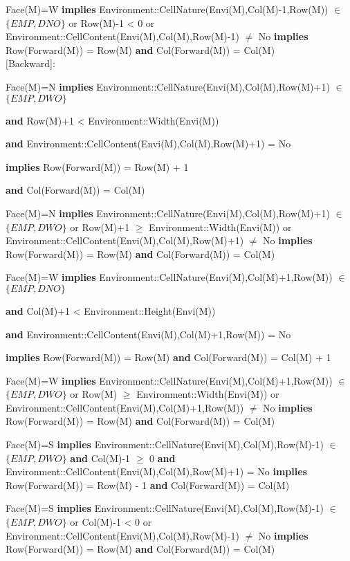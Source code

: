 \documentclass[11pt]{article}
\begin{document}
Face(M)=W \textbf{implies}
Environment::CellNature(Envi(M),Col(M)-1,Row(M)) $\in$
$\{EMP, DNO\}$
or Row(M)-1 < 0
or Environment::CellContent(Envi(M),Col(M),Row(M)-1) $\neq$ No
\textbf{implies} Row(Forward(M)) = Row(M)
\textbf{and} Col(Forward(M)) = Col(M)\\










[Backward]:

Face(M)=N \textbf{implies} Environment::CellNature(Envi(M),Col(M),Row(M)+1) $\in$ $\{EMP, DWO\}$

\textbf{and} Row(M)+1 < Environment::Width(Envi(M))

\textbf{and} Environment::CellContent(Envi(M),Col(M),Row(M)+1) = No

\textbf{implies} Row(Forward(M)) = Row(M) + 1

\textbf{and} Col(Forward(M)) = Col(M) 

Face(M)=N \textbf{implies}
Environment::CellNature(Envi(M),Col(M),Row(M)+1) $\in$  $\{EMP, DWO\}$
or Row(M)+1 $\geq$ Environment::Width(Envi(M)) or Environment::CellContent(Envi(M),Col(M),Row(M)+1) $\neq$ No \textbf{implies} Row(Forward(M)) = Row(M) \textbf{and} Col(Forward(M)) = Col(M)

Face(M)=W \textbf{implies}
Environment::CellNature(Envi(M),Col(M)+1,Row(M)) $\in$ $\{EMP, DNO\}$

\textbf{and} Col(M)+1 < Environment::Height(Envi(M))

\textbf{and} Environment::CellContent(Envi(M),Col(M)+1,Row(M)) = No

\textbf{implies} Row(Forward(M)) = Row(M) \textbf{and} Col(Forward(M)) = Col(M) + 1

Face(M)=W \textbf{implies}
Environment::CellNature(Envi(M),Col(M)+1,Row(M)) $\in$ $\{EMP, DWO\}$
or Row(M) $\geq$ Environment::Width(Envi(M))
or Environment::CellContent(Envi(M),Col(M)+1,Row(M)) $\neq$ No
\textbf{implies} Row(Forward(M)) = Row(M)
\textbf{and} Col(Forward(M)) = Col(M)

Face(M)=S \textbf{implies} Environment::CellNature(Envi(M),Col(M),Row(M)-1) $\in$ $\{EMP, DWO\}$
\textbf{and} Col(M)-1 $\geq$ 0
\textbf{and} Environment::CellContent(Envi(M),Col(M),Row(M)+1) = No
\textbf{implies} Row(Forward(M)) = Row(M) - 1
\textbf{and} Col(Forward(M)) = Col(M)


Face(M)=S \textbf{implies}
Environment::CellNature(Envi(M),Col(M),Row(M)-1) $\in$
$\{EMP, DWO\}$ or Col(M)-1 < 0 or Environment::CellContent(Envi(M),Col(M),Row(M)-1) $\neq$ No
\textbf{implies} Row(Forward(M)) = Row(M)
\textbf{and} Col(Forward(M)) = Col(M)
\end{document}
